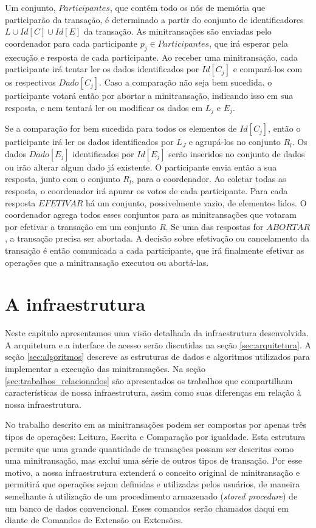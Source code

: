 \documentclass[11pt,twoside,a4paper]{book}
\begin{document}

Um conjunto, $Participantes$, que contém todo os nós de memória que participarão da transação, é determinado a partir do conjunto de identificadores $L \cup Id[C] \cup Id[E]$ da transação. As minitransações são enviadas pelo coordenador para cada participante $p_j \in Participantes$, que irá esperar pela execução e resposta de cada participante. Ao receber uma minitransação, cada participante irá tentar ler os dados identificados por $Id[C_j]$ e compará-los com os respectivos $Dado[C_j]$. Caso a comparação não seja bem sucedida, o participante votará então por abortar a minitransação, indicando isso em sua resposta, e nem tentará ler ou modificar os dados em $L_j$ e $E_j$.

Se a comparação for bem sucedida para todos os elementos de $Id[C_j]$, então o participante irá ler os dados identificados por $L_J$ e agrupá-los no conjunto $R_l$. Os dados $Dado[E_j]$ identificados por $Id[E_j]$ serão inseridos no conjunto de dados ou irão alterar algum dado já existente. O participante envia então a sua resposta, junto com o conjunto $R_l$, para o coordenador. Ao coletar todas as resposta, o coordenador irá apurar os votos de cada participante. Para cada resposta $EFETIVAR$ há um conjunto, possivelmente vazio, de elementos lidos. O coordenador agrega todos esses conjuntos para as minitransações que votaram por efetivar a transação em um conjunto $R$. Se uma das respostas for $ABORTAR$, a transação precisa ser abortada. A decisão sobre efetivação ou cancelamento da transação é então comunicada a cada participante, que irá finalmente efetivar as operações que a minitransação executou ou abortá-las. 

\chapter{A infraestrutura}
\label{chap:implementacao}
Neste capítulo apresentamos uma visão detalhada da infraestrutura desenvolvida. A arquitetura e a interface de acesso serão discutidas na seção \ref{sec:arquitetura}. A seção \ref{sec:algoritmos} descreve as estruturas de dados e algoritmos utilizados para implementar a execução das minitransações. Na seção \ref{sec:trabalhos_relacionados} são apresentados os trabalhos que compartilham características de nossa infraestrutura, assim como suas diferenças em relação à nossa infraestrutura. 

No trabalho descrito em \cite{sinfonia} as minitransações podem ser compostas por apenas três tipos de operações: Leitura, Escrita e Comparação por igualdade. Esta estrutura permite que uma grande quantidade de transações possam ser descritas como uma minitransação, mas exclui uma série de outros tipos de transação. Por esse motivo, a nossa infraestrutura extenderá o conceito original de minitransação e permitirá que operações sejam definidas e utilizadas pelos usuários, de maneira semelhante à utilização de um procedimento armazenado (\emph{stored procedure}) de um banco de dados convencional. Esses comandos serão chamados daqui em diante de Comandos de Extensão ou Extensões.
\end{document}
